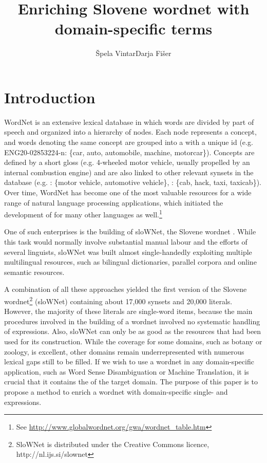 \documentclass[output=paper]{LSP/langsci}
\author{Špela Vintar\lastand Darja Fišer\affiliation{Dept. of Translation, Faculty of Arts, University of Ljubljana}}
\title{Enriching Slovene wordnet with domain-specific terms}
\begin{document}


\section{Introduction}\label{sec:vintar:1}

WordNet \citep{Fellbaum1998} is an extensive lexical database in which words are divided by part of speech and organized into a hierarchy of nodes. Each node represents a concept, and words denoting the same concept are grouped into a  with a unique id (e.g. ENG20-02853224-n: \{car, auto, automobile, machine, motorcar\}). Concepts are defined by a short gloss (e.g. 4-wheeled motor vehicle, usually propelled by an internal combustion engine) and are also linked to other relevant synsets in the database (e.g. : \{motor vehicle, automotive vehicle\}, : \{cab, hack, taxi, taxicab\}). Over time, WordNet has become one of the most valuable resources for a wide range of natural language processing applications, which initiated the development of  for many other languages as well.\footnote{See \url{http://www.globalwordnet.org/gwa/wordnet_table.htm}}


One of such enterprises is the building of sloWNet, the Slovene wordnet \citep{Erjavec2006,Fišer2007,Fišer2008}. While this task would normally involve substantial manual labour and the efforts of several linguists, sloW\-Net was built almost single-handedly exploiting multiple multilingual resources, such as bilingual dictionaries, parallel corpora and online semantic resources. 

A combination of all these approaches yielded the first version of the Slovene wordnet\footnote{SloWNet is distributed under the Creative Commons licence, http://nl.ijs.si/slownet} (sloWNet) containing about 17,000 synsets and 20,000 literals. However, the majority of these literals are single-word items, because the main  procedures involved in the building of a wordnet involved no systematic handling of  expressions. Also, sloWNet can only be as good as the resources that had been used for its construction. While the coverage for some domains, such as botany or zoology, is excellent, other domains remain underrepresented with numerous lexical gaps still to be filled. If we wish to use a wordnet in any domain-specific application, such as Word Sense Disambiguation or Machine Translation, it is crucial that it contains the  of the target domain. The purpose of this paper is to propose a method to enrich a wordnet with domain-specific single- and  expressions. 
\end{document}
